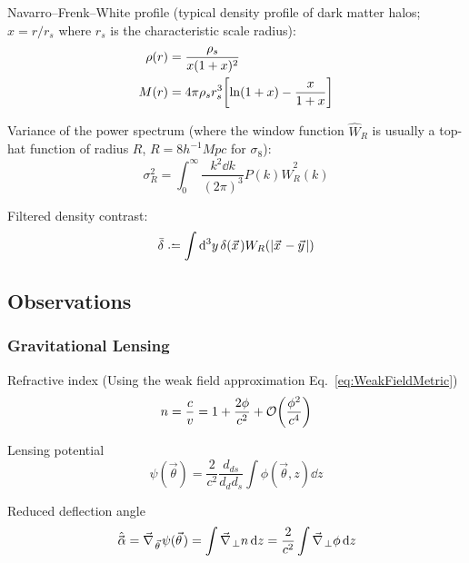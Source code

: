 		\noindent
		Navarro--Frenk--White profile (typical density profile of dark matter halos; $x=r/r_s$ where $r_s$ is the characteristic scale radius):
		\begin{align}
			\rho(r) &= \frac{\rho_s}{x(1+x)^2} \\
			M(r) &= 4\pi \rho_s r_s^3 \qty[\ln(1+x) - \frac{x}{1+x}]
		\end{align}

		\noindent
		Variance of the power spectrum (where the window function $\hat{W}_R$ is usually a top-hat function of radius $R$, \eg $R=8h^{-1}\unit{Mpc}$ for $\sigma_8$):
		\begin{equation}
			\sigma_R^2 = \int_{0}^{\infty} \frac{k^2 \dd k}{(2\pi)^3} P(k) \hat{W}^2_R(k)
		\end{equation}

		\noindent
		Filtered density contrast:
		\begin{equation}
			\bar{\delta} \defeq \int \dd[3]{y} \delta(\vec{x}) W_R(\abs{\vec{x}-\vec{y}})
		\end{equation}

	\subsection{Observations}
		\subsubsection{Gravitational Lensing}
			Refractive index (Using the weak field approximation Eq.~\ref{eq:WeakFieldMetric})
			\begin{equation}
				n = \frac{c}{v} = 1 + \frac{2 \phi}{c^2} + \mathcal{O}\qty(\frac{\phi^2}{c^4})
			\end{equation}

			\noindent
			Lensing potential
			\begin{equation}
				\psi (\vec{\theta})  = \frac{2}{c^2} \frac{d_{ds}}{d_d d_s} \int \phi(\vec{\theta}, z) \dd{z}
			\end{equation}

			\noindent
			Reduced deflection angle
			\begin{equation}
				\hat{\vec{\alpha}}
				= \Nabla_{\vec{\theta}} \psi(\vec{\theta})
				= \int \Nabla_\perp n \dd{z}
				= \frac{2}{c^2} \int \Nabla_\perp \phi \dd{z}
			\end{equation}

